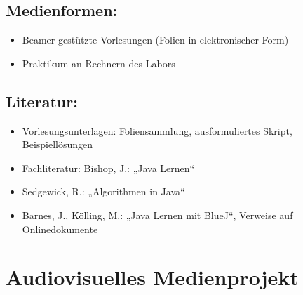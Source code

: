 \section*{Medienformen:}\label{medienformen-1}

\begin{itemize}
\item
  Beamer-gestützte Vorlesungen (Folien in elektronischer Form)
\item
  Praktikum an Rechnern des Labors
\end{itemize}

\section*{Literatur:}\label{literatur-1}

\begin{itemize}
\item
  Vorlesungsunterlagen: Foliensammlung, ausformuliertes Skript,
  Beispiellösungen
\item
  Fachliteratur: Bishop, J.: „Java Lernen``
\item
  Sedgewick, R.: „Algorithmen in Java``
\item
  Barnes, J., Kölling, M.: „Java Lernen mit BlueJ``, Verweise auf
  Onlinedokumente
\end{itemize}

\chapter{Audiovisuelles
Medienprojekt}\label{audiovisuelles-medienprojekt}

